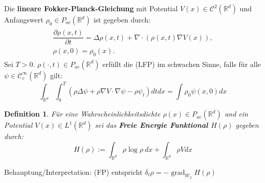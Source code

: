 \documentclass[11pt,a4paper,notitlepage]{scrreprt}
\newcommand{\RR}{\mathbb{R}}
\newcommand{\grad}{\operatorname{grad}}
\newtheorem{defi}{Definition}[section]
\begin{document}
Die \textbf{lineare Fokker-Planck-Gleichung}  mit Potential ${V(x)\in \mathcal{C}^2(\RR^d)}$ und Anfangswert $\rho_0\in P_{ac}(\RR^d)$ ist gegeben durch:
\begin{align}\tag{FP}
\begin{split}
\dfrac{\partial\rho(x,t)}{\partial t}=\Delta\rho(x,t)+\nabla\cdot(\rho(x,t)\nabla V(x)),\\
\rho(x,0)=\rho_0(x).\label{FP}
\end{split}
\end{align}
Sei $T>0$. $\rho(\cdot,t)\in P_{ac}(\RR^d)$ erfüllt die (LFP) im schwachen Sinne, falls für alle $\psi\in \mathcal{C}_c^\infty(\RR^d)$ gilt:
\begin{equation}
\int_{\RR^d} \int_0^T (\rho\Delta\psi+\rho\nabla V\cdot\nabla\psi -\rho\psi_t) dt dx=\int\rho_0\psi(x,0)dx \label{FPweak}
\end{equation}

\vspace{10pt}

\begin{defi}
Für eine Wahrscheinlichkeitsdichte $\rho(x)\in P_{ac}(\RR^d)$ und ein Potential $V(x)\in L^1(\RR^d)$ sei das \textbf{Freie Energie Funktional $H(\rho)$} gegeben durch:
\begin{equation}
H(\rho):=\int_{\RR^d} \rho\log\rho~ dx + \int_{\RR^d}\rho V dx \label{FEFktn}
\end{equation}
\end{defi}
\vspace{10pt}
Behauptung/Interpretation: (FP) entspricht $\delta_t\rho = -\grad_{W_2} H(\rho)$
\end{document}
